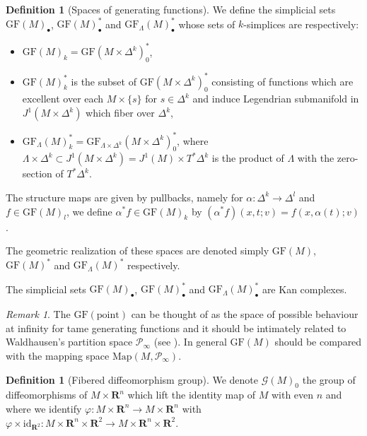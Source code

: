 \documentclass[12pt,a4paper]{article}
\numberwithin{equation}{section}
\theoremstyle{definition}
\newtheorem{dfn}[equation]{Definition}
\theoremstyle{remark}
\newtheorem{rem}[equation]{Remark}
\renewcommand{\P}{\mathcal{P}}
\newcommand{\R}{\mathbf{R}}
\newcommand{\Map}{\mathrm{Map}}
\newcommand{\id}{\mathrm{id}}
\newcommand{\G}{\mathcal{G}}
\newcommand{\GF}{\mathrm{GF}}
\begin{document}
\begin{dfn}[Spaces of generating functions]\label{dfn:spaceGF}
We define the simplicial sets $\GF(M)_\bullet$, $\GF(M)^*_\bullet$ and $\GF_\Lambda(M)^*_\bullet$ whose sets of $k$-simplices are respectively:
\begin{itemize}
\item $\GF(M)_k=\GF(M\times \Delta^k)^*_0$,
\item $\GF(M)_k^*$ is the subset of $\GF(M\times \Delta^k)^*_0$ consisting of functions which are excellent
over each $M\times \{s\}$ for $s\in \Delta^k$ and induce Legendrian submanifold in $J^1(M\times \Delta^k)$ which fiber over $\Delta^k$,
\item $\GF_\Lambda(M)_k^*=\GF_{\Lambda\times \Delta^k}(M\times \Delta^k)^*_0$, where $\Lambda\times \Delta^k\subset J^1(M\times \Delta^k)=J^1(M) \times T^*\Delta^k$ is the product of $\Lambda$ with the zero-section of $T^*\Delta^k$.
\end{itemize}

The structure maps are given by pullbacks, namely for $\alpha : \Delta^k \to \Delta^l$ and $f\in \GF(M)_l$, we define $\alpha^* f \in \GF(M)_k$ by $(\alpha^* f)(x,t;v)=f(x,\alpha(t);v)$.

The geometric realization of these spaces are denoted simply $\GF(M)$, $\GF(M)^*$ and $\GF_\Lambda(M)^*$ respectively.

\end{dfn}

The simplicial sets $\GF(M)_\bullet$, $\GF(M)^*_\bullet$ and $\GF_\Lambda(M)^*_\bullet$ are Kan complexes.

\begin{rem}\label{rem:waldhausen}
The $\GF(\mathrm{point})$ can be thought of as the space of possible behaviour at infinity
for tame generating functions and it should be intimately related to Waldhausen's partition space $\P_\infty$ (see \cite{waldhausen_1982}).
In general $\GF(M)$ should be compared with the mapping space $\Map(M,\P_\infty)$.
\end{rem}



\begin{dfn}[Fibered diffeomorphism group]
We denote $\G(M)_0$ the group of diffeomorphisms of $M\times \R^n$ which lift the identity map of $M$
with even $n$ and where we identify $\varphi:M\times \R^n\to M\times \R^n$ with
$\varphi\times \id_{\R^2}:M\times \R^n\times \R^2 \to M\times \R^n\times \R^2$.
\end{dfn}
\end{document}
